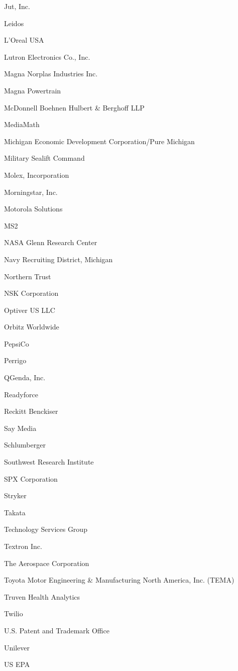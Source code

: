 \documentclass[twoside]{article}
\begin{document}
\begin{center}
\begin{multicols}{5}
\begin{FlushLeft}
\begin{compactitem}
\item Jut, Inc.
\item Leidos
\item L'Oreal USA
\item Lutron Electronics Co., Inc.
\item Magna Norplas Industries Inc.
\item Magna Powertrain
\item McDonnell Boehnen Hulbert \& Berghoff LLP
\item MediaMath
\item Michigan Economic Development Corporation/Pure Michigan
\item Military Sealift Command
\item Molex, Incorporation
\item Morningstar, Inc.
\item Motorola Solutions
\item MS2
\item NASA Glenn Research Center
\item Navy Recruiting District, Michigan
\item Northern Trust
\item NSK Corporation
\item Optiver US LLC
\item Orbitz Worldwide
\item PepsiCo
\item Perrigo
\item QGenda, Inc.
\item Readyforce
\item Reckitt Benckiser
\item Say Media
\item Schlumberger
\item Southwest Research Institute
\item SPX Corporation
\item Stryker
\item Takata
\item Technology Services Group
\item Textron Inc.
\item The Aerospace Corporation
\item Toyota Motor Engineering \& Manufacturing North America, Inc. (TEMA)
\item Truven Health Analytics
\item Twilio
\item U.S. Patent and Trademark Office
\item Unilever
\item US EPA

\end{compactitem}
\end{FlushLeft}
\end{multicols}
\end{center}
\end{document}
